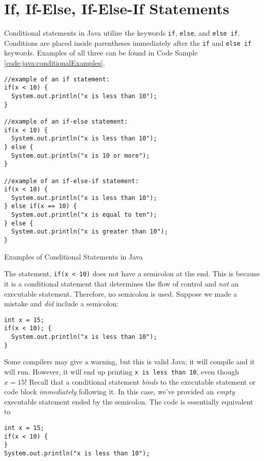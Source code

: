 \section{If, If-Else, If-Else-If Statements}

Conditional statements in Java utilize the keywords \texttt{if}, \texttt{else}, and
\texttt{else if}.  Conditions are placed inside parentheses immediately after the 
\texttt{if} and \texttt{else if} keywords.  Examples of all three can be 
found in Code Sample \ref{code:java:conditionalExamples}.

\begin{listing}
\begin{verbatim}
//example of an if statement:
if(x < 10) {
  System.out.println("x is less than 10");
}

//example of an if-else statement:
if(x < 10) {
  System.out.println("x is less than 10");
} else {
  System.out.println("x is 10 or more");
}

//example of an if-else-if statement:
if(x < 10) {
  System.out.println("x is less than 10");
} else if(x == 10) {
  System.out.println("x is equal to ten");
} else {
  System.out.println("x is greater than 10");
}
\end{verbatim}
\caption{Examples of Conditional Statements in Java}
\label{code:java:conditionalExamples}
\end{listing}

The statement, \texttt{if(x < 10)}
does not have a semicolon at the end.  This is because it is a conditional statement
that determines the flow of control and \emph{not} an executable statement.  
Therefore, no semicolon is used.  Suppose we made a mistake and \emph{did}
include a semicolon:

\begin{verbatim}
int x = 15;
if(x < 10); {
  System.out.println("x is less than 10");
}
\end{verbatim}

Some compilers may give a warning, but this is valid Java; it will compile and it 
will run.  However, it will end up printing \texttt{x is less than 10}, even
though $x = 15$!  Recall that a conditional statement \emph{binds} to the 
executable statement or code block \emph{immediately} following it.  In this
case, we've provided an \emph{empty} executable statement ended by the
semicolon.  The code is essentially equivalent to 

\begin{verbatim}
int x = 15;
if(x < 10) {
}
System.out.println("x is less than 10");
\end{verbatim}

